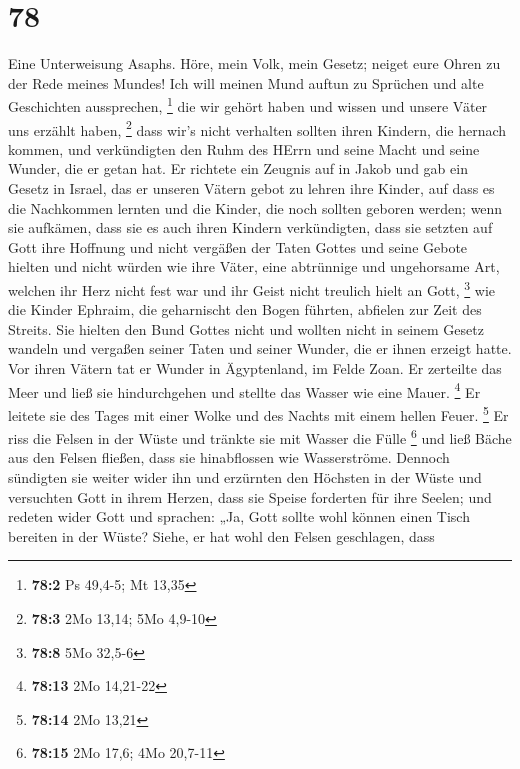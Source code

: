 \hypertarget{section-77}{%
\section{78}\label{section-77}}

 Eine Unterweisung Asaphs. Höre, mein Volk, mein Gesetz;
neiget eure Ohren zu der Rede meines Mundes!  Ich will
meinen Mund auftun zu Sprüchen und alte Geschichten aussprechen,
\footnote{\textbf{78:2} Ps 49,4-5; Mt 13,35}  die wir
gehört haben und wissen und unsere Väter uns erzählt haben, \footnote{\textbf{78:3}
  2Mo 13,14; 5Mo 4,9-10}  dass wir's nicht verhalten
sollten ihren Kindern, die hernach kommen, und verkündigten den Ruhm des
HErrn und seine Macht und seine Wunder, die er getan hat. 
Er richtete ein Zeugnis auf in Jakob und gab ein Gesetz in Israel, das
er unseren Vätern gebot zu lehren ihre Kinder,  auf dass
es die Nachkommen lernten und die Kinder, die noch sollten geboren
werden; wenn sie aufkämen, dass sie es auch ihren Kindern verkündigten,
 dass sie setzten auf Gott ihre Hoffnung und nicht
vergäßen der Taten Gottes und seine Gebote hielten  und
nicht würden wie ihre Väter, eine abtrünnige und ungehorsame Art,
welchen ihr Herz nicht fest war und ihr Geist nicht treulich hielt an
Gott, \footnote{\textbf{78:8} 5Mo 32,5-6}  wie die Kinder
Ephraim, die geharnischt den Bogen führten, abfielen zur Zeit des
Streits.  Sie hielten den Bund Gottes nicht und wollten
nicht in seinem Gesetz wandeln  und vergaßen seiner Taten
und seiner Wunder, die er ihnen erzeigt hatte.  Vor ihren
Vätern tat er Wunder in Ägyptenland, im Felde Zoan.  Er
zerteilte das Meer und ließ sie hindurchgehen und stellte das Wasser wie
eine Mauer. \footnote{\textbf{78:13} 2Mo 14,21-22}  Er
leitete sie des Tages mit einer Wolke und des Nachts mit einem hellen
Feuer. \footnote{\textbf{78:14} 2Mo 13,21}  Er riss die
Felsen in der Wüste und tränkte sie mit Wasser die Fülle \footnote{\textbf{78:15}
  2Mo 17,6; 4Mo 20,7-11}  und ließ Bäche aus den Felsen
fließen, dass sie hinabflossen wie Wasserströme.  Dennoch
sündigten sie weiter wider ihn und erzürnten den Höchsten in der Wüste
 und versuchten Gott in ihrem Herzen, dass sie Speise
forderten für ihre Seelen;  und redeten wider Gott und
sprachen: „Ja, Gott sollte wohl können einen Tisch bereiten in der
Wüste?  Siehe, er hat wohl den Felsen geschlagen, dass
